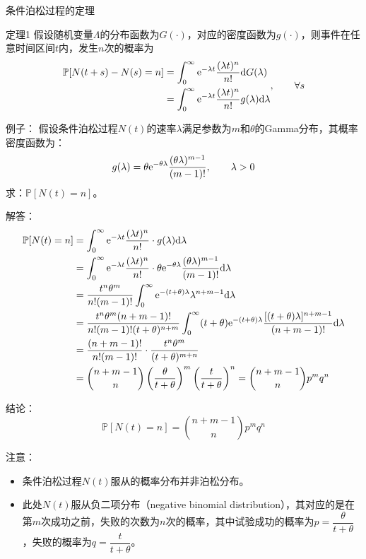 \documentclass[t]{beamer}
\renewcommand{\Pr}{\mathbb{P}}
\begin{document}
\begin{frame}{条件泊松过程的定理}
\begin{block}{定理1}
假设随机变量$\Lambda$的分布函数为$G(\cdot)$，对应的密度函数为$g(\cdot)$，则事件在任意时间区间$t$内，发生$n$次的概率为
\[\begin{split}
	\Pr[N(t+s)-N(s)=n]&=\int^{\infty}_0 {\rm e}^{-\lambda t} \frac{(\lambda t)^n}{n!}\dd G(\lambda)\\ 
	&=\int^{\infty}_0 {\rm e}^{-\lambda t} \frac{(\lambda t)^n}{n!} g(\lambda)\dd \lambda
\end{split}, \qquad \forall s\]
\end{block}
    

\end{frame}

\begin{frame}{例子：}
假设条件泊松过程$N(t)$的速率$\lambda$满足参数为$m$和$\theta$的Gamma分布，其概率密度函数为：
\[g(\lambda)=\theta {\rm e}^{-\theta \lambda}\frac{(\theta \lambda)^{m-1}}{(m-1)!},\qquad \lambda>0 \]
求：$\Pr[N(t)=n]$。
    

\end{frame}

\begin{frame}{解答：}
\[\begin{split}
	\Pr[N(t)=n]&=\int^{\infty}_0 {\rm e}^{-\lambda t}\frac{(\lambda t)^n}{n!}\cdot g(\lambda)\dd \lambda \\ 
	&=\int^{\infty}_0 {\rm e}^{-\lambda t}\frac{(\lambda t)^n}{n!}\cdot \theta {\rm e}^{-\theta \lambda}\frac{(\theta \lambda)^{m-1}}{(m-1)!}\dd \lambda \\ 
	&=\frac{t^n \theta^m}{n!(m-1)!}\int^{\infty}_0 {\rm e}^{-(t+\theta)\lambda} \lambda^{n+m-1}\dd \lambda\\
    &=\frac{t^n \theta^m(n+m-1)!}{n!(m-1)!(t+\theta)^{n+m}}\int^{\infty}_0 (t+\theta){\rm e}^{-(t+\theta)\lambda}\frac{[(t+\theta)\lambda]^{n+m-1}}{(n+m-1)!}\dd\lambda \\
&=\frac{(n+m-1)!}{n!(m-1)!}\cdot \frac{t^n\theta^m}{(t+\theta)^{m+n}}\\
&={n+m-1 \choose n}\left(\frac{\theta}{t+\theta}\right)^m \left(\frac{t}{t+\theta}\right)^n={n+m-1 \choose n}p^m q^n
\end{split} \]
    

\end{frame}

\begin{frame}{结论：}
\[\Pr[N(t)=n]={n+m-1 \choose n}p^m q^n\]
    
\begin{block}{注意：}
    \begin{itemize}
        \item 条件泊松过程$N(t)$服从的概率分布并非泊松分布。
        \item 此处$N(t)$服从负二项分布（negative binomial distribution），其对应的是在第$m$次成功之前，失败的次数为$n$次的概率，其中试验成功的概率为$p=\dfrac{\theta}{t+\theta}$，失败的概率为$q=\dfrac{t}{t+\theta}$。
    \end{itemize}
    
\end{block}
\end{frame}
\end{document}
